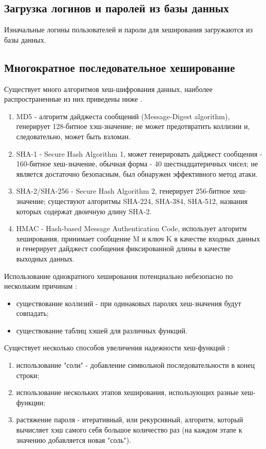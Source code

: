 \documentclass[a4paper,oneside,14pt]{extreport}
\begin{document}
\subsection{Загрузка логинов и паролей из базы данных}
Изначальные логины пользователей и пароли для хеширования загружаются из базы данных.

\subsection{Многократное последовательное хеширование}
Существует много алгоритмов хеш-шифрования данных, наиболее распространенные из них приведены ниже \cite{hashes}.
\begin{enumerate}
	\item MD5 - алгоритм дайджеста сообщений (Message-Digest algorithm), генерирует 128-битное хэш-значение; не может предотвратить коллизии и, следовательно, может быть взломан.
	\item SHA-1 - Secure Hash Algorithm 1, может генерировать дайджест сообщения - 160-битное хеш-значение, обычная форма - 40 шестнадцатеричных чисел; не является достаточно безопасным, был обнаружен эффективного метод атаки.
	\item SHA-2/SHA-256 - Secure Hash Algorithm 2, генерирует 256-битное хеш-значение; существуют алгоритмы SHA-224, SHA-384, SHA-512, названия которых содержат двоичную длину SHA-2.
	\item HMAC - Hash-based Message Authentication Code, использует алгоритм хеширования, принимает сообщение M и ключ K в качестве входных данных и генерирует дайджест сообщения фиксированной длины в качестве выходных данных.
\end{enumerate}

Использование однократного хеширования потенциально небезопасно по нескольким причинам \cite{security}:
\begin{itemize}
	\item существование коллизий - при одинаковых паролях хеш-значения будут совпадать;
	\item существование таблиц хэшей для различных функций.
\end{itemize}

Существует несколько способов увеличения надежности хеш-функций \cite{security}:
\begin{enumerate}
	\item использование "соли" - добавление символьной последовательности в конец строки;
	\item использование нескольких этапов хеширования, использующих разные хеш-функции;
	\item растяжение пароля - итеративный, или рекурсивный, алгоритм, который вычисляет хэш самого себя большое количество раз (на каждом этапе к значению добавляется новая "соль").
\end{enumerate}
\end{document}
